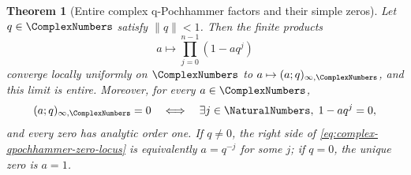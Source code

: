 \documentclass[11pt,oneside]{article}
\newtheorem{theorem}{Theorem}[section]
\theoremstyle{definition}
\theoremstyle{remark}
\begin{document}
\begin{theorem}[Entire complex q-Pochhammer factors and their simple zeros]
\label{thm:complex-qpochhammer-entire-simple}
Let \(q\in\ComplexNumbers\) satisfy \(\lVert q\rVert<1\).  Then the finite products
\[
 a\longmapsto\prod_{j=0}^{n-1}(1-aq^j)
\]
converge locally uniformly on \(\ComplexNumbers\) to
\(a\mapsto(a;q)_{\infty,\ComplexNumbers}\), and this limit is entire.  Moreover,
for every \(a\in\ComplexNumbers\),
\begin{equation}
 (a;q)_{\infty,\ComplexNumbers}=0
 \quad\Longleftrightarrow\quad
 \exists j\in\NaturalNumbers,\;1-aq^j=0,                 \label{eq:complex-qpochhammer-zero-locus}
\end{equation}
and every zero has analytic order one.  If \(q\ne0\), the right side of
\eqref{eq:complex-qpochhammer-zero-locus} is equivalently
\(a=q^{-j}\) for some \(j\); if \(q=0\), the unique zero is \(a=1\).
\end{theorem}
\end{document}
